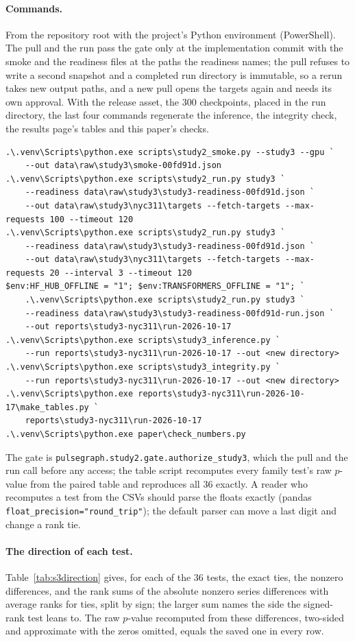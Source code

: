 \paragraph{Commands.} From the repository root with the project's Python environment (PowerShell). The pull
and the run pass the gate only at the implementation commit with the smoke and the readiness files at the
paths the readiness names; the pull refuses to write a second snapshot and a completed run directory is
immutable, so a rerun takes new output paths, and a new pull opens the targets again and needs its own
approval. With the release asset, the 300 checkpoints, placed in the run directory, the last four commands
regenerate the inference, the integrity check, the results page's tables and this paper's checks.
{\footnotesize
\begin{verbatim}
.\.venv\Scripts\python.exe scripts\study2_smoke.py --study3 --gpu `
    --out data\raw\study3\smoke-00fd91d.json
.\.venv\Scripts\python.exe scripts\study2_run.py study3 `
    --readiness data\raw\study3\study3-readiness-00fd91d.json `
    --out data\raw\study3\nyc311\targets --fetch-targets --max-requests 100 --timeout 120
.\.venv\Scripts\python.exe scripts\study2_run.py study3 `
    --readiness data\raw\study3\study3-readiness-00fd91d.json `
    --out data\raw\study3\nyc311\targets --fetch-targets --max-requests 20 --interval 3 --timeout 120
$env:HF_HUB_OFFLINE = "1"; $env:TRANSFORMERS_OFFLINE = "1"; `
    .\.venv\Scripts\python.exe scripts\study2_run.py study3 `
    --readiness data\raw\study3\study3-readiness-00fd91d-run.json `
    --out reports\study3-nyc311\run-2026-10-17
.\.venv\Scripts\python.exe scripts\study3_inference.py `
    --run reports\study3-nyc311\run-2026-10-17 --out <new directory>
.\.venv\Scripts\python.exe scripts\study3_integrity.py `
    --run reports\study3-nyc311\run-2026-10-17 --out <new directory>
.\.venv\Scripts\python.exe reports\study3-nyc311\run-2026-10-17\make_tables.py `
    reports\study3-nyc311\run-2026-10-17
.\.venv\Scripts\python.exe paper\check_numbers.py
\end{verbatim}}
The gate is \texttt{pulsegraph.study2.gate.authorize\_study3}, which the pull and the run call before any
access; the table script recomputes every family test's raw $p$-value from the paired table and reproduces
all 36 exactly. A reader who recomputes a test from the CSVs should parse the floats exactly (pandas
\texttt{float\_precision="round\_trip"}); the default parser can move a last digit and change a rank tie.

\paragraph{The direction of each test.} Table~\ref{tab:s3direction} gives, for each of the 36 tests, the
exact ties, the nonzero differences, and the rank sums of the absolute nonzero series differences with
average ranks for ties, split by sign; the larger sum names the side the signed-rank test leans to. The raw
$p$-value recomputed from these differences, two-sided and approximate with the zeros omitted, equals the
saved one in every row.

